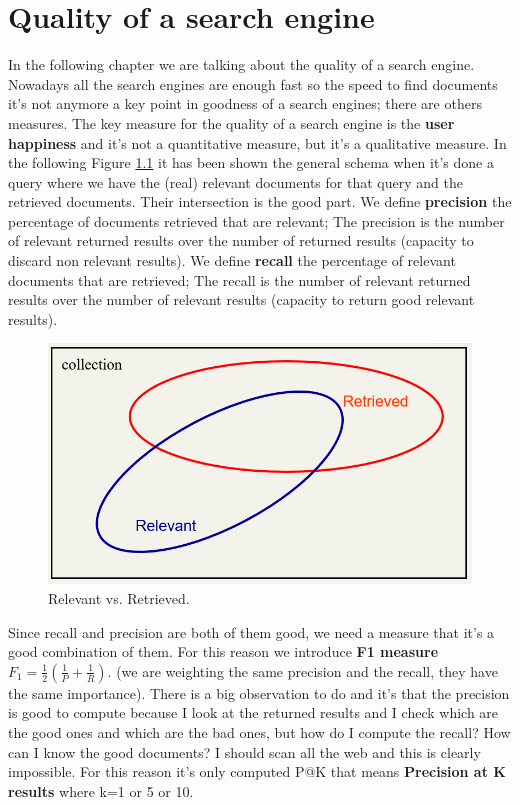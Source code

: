 \chapter{Quality of a search engine}
In the following chapter we are talking about the quality of a search engine. Nowadays all the search engines are enough fast so the speed to find documents it's not anymore a key point in goodness of a search engines; there are others measures.\newline
The key measure for the quality of a search engine is the \textbf{user happiness} and it's not a quantitative measure, but it's a qualitative measure.\newline
In the following Figure \ref{fig:generalschema} it has been shown the general schema when it's done a query where we have the (real) relevant documents for that query and the retrieved documents. Their intersection is the good part.\newline
We define \textbf{precision} the percentage of documents retrieved that are relevant; The precision is the number of relevant returned results over the number of returned results (capacity to discard non relevant results).\newline
We define \textbf{recall} the percentage of relevant documents that are retrieved; The recall is the number of relevant returned results over the number of relevant results (capacity to return good relevant results).\newline
\begin{figure}
    \centering
    \includegraphics[width=0.75\linewidth]{images/generalschema.PNG}
    \caption{Relevant vs. Retrieved.}
    \label{fig:generalschema}
\end{figure}
Since recall and precision are both of them good, we need a measure that it's a good combination of them. For this reason we introduce \textbf{F1 measure} $F_1=\frac{1}{2}(\frac{1}{P}+\frac{1}{R})$. (we are weighting the same precision and the recall, they have the same importance).\newline
There is a big observation to do and it's that the precision is good to compute because I look at the returned results and I check which are the good ones and which are the bad ones, but how do I compute the recall? How can I know the good documents? I should scan all the web and this is clearly impossible.\newline 
For this reason it's only computed P@K that means \textbf{Precision at K results} where k=1 or 5 or 10.\newline
